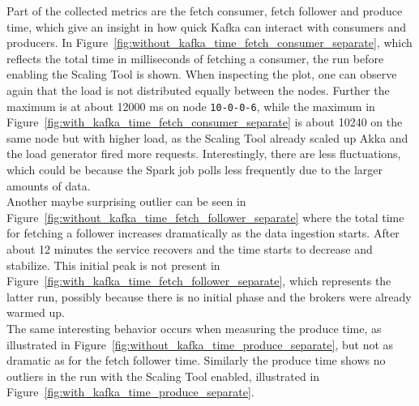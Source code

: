 Part of the collected metrics are the fetch consumer, fetch follower and produce time, which give an insight in how quick Kafka can interact with consumers and producers.
In Figure~\ref{fig:without_kafka_time_fetch_consumer_separate}, which reflects the total time in milliseconds of fetching a consumer, the run before enabling the Scaling Tool is shown.
When inspecting the plot, one can observe again that the load is not distributed equally between the nodes.
Further the maximum is at about 12000 ms on node \verb|10-0-0-6|, while the maximum in Figure~\ref{fig:with_kafka_time_fetch_consumer_separate} is about 10240 on the same node but with higher load, as the Scaling Tool already scaled up Akka and the load generator fired more requests.
Interestingly, there are less fluctuations, which could be because the Spark job polls less frequently due to the larger amounts of data.\\
Another maybe surprising outlier can be seen in Figure~\ref{fig:without_kafka_time_fetch_follower_separate} where the total time for fetching a follower increases dramatically as the data ingestion starts.
After about 12 minutes the service recovers and the time starts to decrease and stabilize.
This initial peak is not present in Figure~\ref{fig:with_kafka_time_fetch_follower_separate}, which represents the latter run, possibly because there is no initial phase and the brokers were already warmed up.\\
The same interesting behavior occurs when measuring the produce time, as illustrated in Figure~\ref{fig:without_kafka_time_produce_separate}, but not as dramatic as for the fetch follower time.
Similarly the produce time shows no outliers in the run with the Scaling Tool enabled, illustrated in Figure~\ref{fig:with_kafka_time_produce_separate}.





